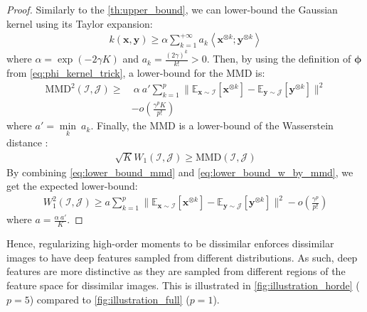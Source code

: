 \documentclass[10pt,twocolumn,letterpaper]{article}
\def\vx{{\bm{x}}}
\def\vy{{\bm{y}}}
\newcommand{\E}{\mathbb{E}}
\begin{document}
        \begin{proof}
            Similarly to the \autoref{th:upper_bound}, we can lower-bound the Gaussian kernel using its Taylor expansion:
            \begin{align}
                \nonumber k(\vx, \vy) \geq \alpha \sum_{k=1}^{+\infty} a_k \left< \vx^{\otimes k} ; \vy^{\otimes k} \right>
            \end{align}
            where $\alpha = \exp(-2 \gamma K)$ and $a_k =\frac{(2\gamma)^k}{k!} > 0$.
            Then, by using the definition of $\boldsymbol{\phi}$ from \autoref{eq:phi_kernel_trick}, a lower-bound for the MMD is:
\begin{align}\label{eq:lower_bound_mmd}
\nonumber \text{MMD}^2(\mathcal{I},\mathcal{J}) \geq & \ \alpha \ a' \sum_{k=1}^p \| \E_{\vx\sim \mathcal{I}}[\vx^{\otimes k}]  - \E_{\vy\sim \mathcal{J}}[\vy^{\otimes k}] \|^2 \\
                & - o(\frac{\gamma^p K}{p!})
            \end{align}
            where $a' = \underset{k}{\min} \ a_k$.
            Finally, the MMD is a lower-bound of the Wasserstein distance \cite{Sriperumbudur_2010_JMLR}:
            \begin{align}\label{eq:lower_bound_w_by_mmd}
                \sqrt{K} W_1(\mathcal{I}, \mathcal{J}) \geq \text{MMD}(\mathcal{I}, \mathcal{J})
            \end{align}
            By combining \autoref{eq:lower_bound_mmd} and \autoref{eq:lower_bound_w_by_mmd}, we get the expected lower-bound:
            \begin{align}
                W_1^2(\mathcal{I}, \mathcal{J}) \geq a \sum_{k=1}^p \| \E_{\vx\sim \mathcal{I}}[\vx^{\otimes k}]  - \E_{\vy\sim \mathcal{J}}[\vy^{\otimes k}] \|^2 - o(\frac{\gamma^p}{p!})
            \end{align}
            where $a = \frac{\alpha \ a'}{K}$.
        \end{proof}
        Hence, regularizing high-order moments to be dissimilar enforces dissimilar images to have deep features sampled from different distributions.
        As such, deep features are more distinctive as they are sampled from different regions of the feature space for dissimilar images.
        This is illustrated in \autoref{fig:illustration_horde} ($p=5$) compared to \autoref{fig:illustration_full} ($p=1$).
        
        
\end{document}
